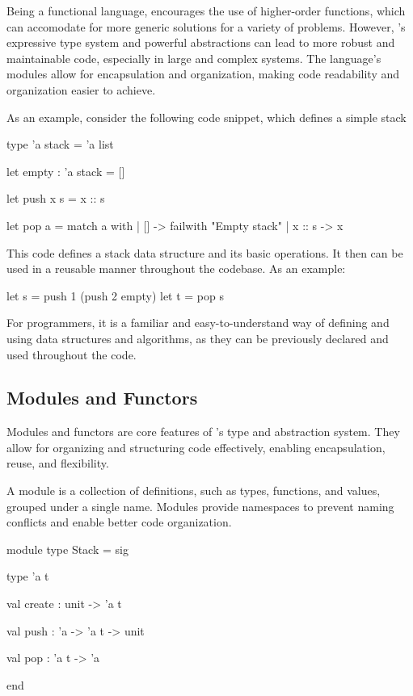 Being a functional language, \ocaml encourages the use of higher-order functions, 
which can accomodate for more generic solutions for a variety of problems. However,
\ocaml's expressive type system and powerful abstractions can lead to more robust
and maintainable code, especially in large and complex systems. The language's 
modules allow for encapsulation and organization, making code readability and organization 
easier to achieve.

As an example, consider the following code snippet, which defines a simple stack

\begin{ocamlenv}
    type 'a stack = 'a list

    let empty : 'a stack = []

    let push x s = x :: s

    let pop a =
        match a with
        | [] -> failwith "Empty stack"
        | x :: s -> x
\end{ocamlenv}

This code defines a stack data structure and its basic operations. It then can be used 
in a reusable manner throughout the codebase. As an example:

\begin{ocamlenv}
    let s = push 1 (push 2 empty)
    let t = pop s
\end{ocamlenv}

For programmers, it is a familiar and easy-to-understand way of defining and using 
data structures and algorithms, as they can be previously declared and used throughout 
the code.

\subsection{Modules and Functors} %
\label{sub:modules_and_functors}

Modules and functors are core features of \ocaml’s type and abstraction system. 
They allow for organizing and structuring code effectively, enabling encapsulation, 
reuse, and flexibility.

A module is a collection of definitions, such as types, functions, and values, 
grouped under a single name. Modules provide namespaces to prevent naming conflicts 
and enable better code organization.

\begin{ocamlenv}
    module type Stack = sig

        type 'a t

        val create : unit -> 'a t

        val push : 'a -> 'a t -> unit

        val pop : 'a t -> 'a

    end
\end{ocamlenv}

